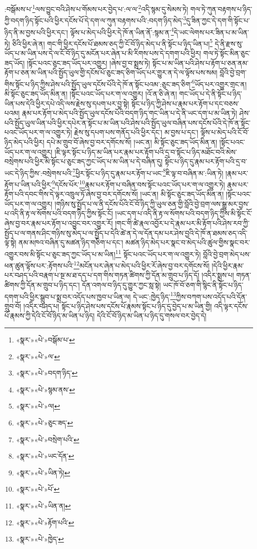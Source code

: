 :བསྒོམས་པ་\footnote{«སྣར་»«པེ་»བསྒོམ་པ་}ལས་བྱུང་བའི་ཤེས་པ་གོམས་པར་བྱེད་པ་:ལ་ལ་\footnote{«སྣར་»«པེ་»ལ་}འདི་སྙམ་དུ་སེམས་ཏེ། གལ་ཏེ་ཀུན་བརྟགས་པ་ཉིད་ཀྱི་བདག་ཉིད་སྟོང་པའི་ཕྱིར་དངོས་པོ་དེ་དག་ལ་ཀུན་བརྟགས་པའི་:བདག་ཉིད་མེད་\footnote{«སྣར་»«པེ་»བདག་ཉིད་}དུ་ཟིན་ཀྱང་དེ་དག་གི་སྟོང་པ་ཉིད་ནི་མ་བྱས་པའི་ཕྱིར་དང་། ལྟོས་པ་མེད་པའི་ཕྱིར་དེ་ཁོ་ན་ཡིན་ནོ་:སྙམ་ན་\footnote{«སྣར་»«པེ་»སྙམ་ནས་}དེ་ཡང་ལེགས་པར་ཟིན་པ་མ་ཡིན་ཏེ། ཅིའི་ཕྱིར་ཞེ་ན། གང་གི་ཕྱིར་དངོས་པོ་ཐམས་ཅད་ཀྱི་ངོ་བོ་ཉིད་མེད་པ་ནི་སྟོང་པ་ཉིད་ཡིན་པ།\footnote{«སྣར་»«པེ་»ལ།} དེ་ནི་རྫས་སུ་ཡོད་པ་མ་ཡིན་པས་དེ་ལ་ངོ་བོ་ཉིད་དུ་མངོན་པར་ཞེན་པ་མི་རིགས་པས་དེ་དགག་པའི་ཕྱིར། གལ་ཏེ་སྟོང་མིན་ཅུང་ཟད་ཡོད། །སྟོང་པའང་ཅུང་ཟད་ཡོད་པར་འགྱུར། །ཞེས་བྱ་བ་སྨྲས་ཏེ། སྟོང་པ་མ་ཡིན་པའི་ཤེས་པ་རྟོག་པ་ཅན་ནམ་རྟོག་པ་ཅན་མ་ཡིན་པའི་སྤྱོད་ཡུལ་གྱི་དངོས་པོ་ཅུང་ཟད་ཅིག་ཡོད་པར་གྱུར་ན་དེ་ལ་ལྟོས་པས་སམ། བློའི་བྱེ་བྲག་གིས་སྟོང་པ་ཉིད་ཀྱིས་ཤེས་པའི་སྤྱོད་ཡུལ་དངོས་པོའི་དེ་ཁོ་ན་སྟོང་པའམ་:ཅུང་ཟད་ཅིག་\footnote{«སྣར་»«པེ་»ཅུང་ཟད་}ཡོད་པར་འགྱུར་གྲང་ན། མི་སྟོང་ཅུང་ཟད་ཡོད་མིན་ན། །སྟོང་པའང་ཡོད་པར་ག་ལ་འགྱུར། །འོ་ན་ཅི་ཞེ་ན། གང་ཡོད་པ་དེ་ནི་སྟོང་པ་ཉིད་ཡིན་པས་དེའི་ཕྱིར་དཔེ་འདི་ལས་རྗེས་སུ་དཔག་པར་བྱ་སྟེ། སྟོང་པ་ཉིད་ཀྱི་ཤེས་པ་རྣམ་པར་རྟོག་པ་དང་བཅས་པའམ། རྣམ་པར་རྟོག་པ་མེད་པའི་སྤྱོད་ཡུལ་དངོས་པོའི་བདག་ཉིད་གང་ཡིན་པ་དེ་ནི་ཡང་དག་པ་མ་ཡིན་ཏེ། ཤེས་པའི་སྤྱོད་ཡུལ་ཡིན་པའི་ཕྱིར་དཔེར་ན་སྟོང་པ་མ་ཡིན་པའི་ཤེས་པའི་སྤྱོད་ཡུལ་བཞིན་པས་དངོས་པོའི་དེ་ཁོ་ན་སྟོང་པའང་ཡོད་པར་ག་ལ་འགྱུར་ཏེ། རྗེས་སུ་དཔག་པས་གནོད་པའི་ཕྱིར་དང་། མ་བྱས་པ་དང་། ལྟོས་པ་མེད་པའི་ངོ་བོ་ཉིད་མེད་པའི་ཕྱིར། དཔེ་མ་གྲུབ་བོ་ཞེས་བྱ་བར་དགོངས་སོ། །ཡང་ན། མི་སྟོང་ཅུང་ཟད་ཡོད་མིན་ན། །སྟོང་པའང་ཡོད་པར་ག་ལ་འགྱུར། །ཇི་ལྟར་སྟོང་པ་ཉིད་མ་ཡིན་པར་རྣམ་པར་རྟོག་པའི་དྲ་བ་སྟོང་པ་ཉིད་མཐོང་བའི་མེས་བསྲེགས་པའི་ཕྱིར་མི་སྟོང་པ་ཅུང་ཟད་ཀྱང་ཡོད་པ་མ་ཡིན་པ་དེ་བཞིན་དུ། སྟོང་པ་ཉིད་དུ་རྣམ་པར་རྟོག་པའི་དྲ་བ་ཡང་དེ་ཉིད་ཀྱིས་:བསྲེགས་པའི་\footnote{«སྣར་»«པེ་»བསྲེག་པའི་}ཕྱིར་སྟོང་པ་ཉིད་དུ་རྣམ་པར་རྟོག་པ་ཡང་\footnote{«སྣར་»«པེ་»ཡང་དོན་}ཇི་ལྟ་བ་བཞིན་མ་:ཡིན་ཏེ། །རྣམ་པར་རྟོག་པ་ཡིན་པའི་ཕྱིར་\footnote{«སྣར་»«པེ་»ཡིན་ཏེ། }དངོས་པོར་\footnote{«སྣར་»«པེ་»པོ་}རྣམ་པར་རྟོག་པ་བཞིན་བས་སྟོང་པའང་ཡོད་པར་ག་ལ་འགྱུར་ཏེ། རྣམ་པར་རྟོག་པའི་དབང་གིས་དེ་ལྟར་འཁྲུལ་ཏོ་ཞེས་བྱ་བར་དགོངས་སོ། །ཡང་ན། མི་སྟོང་ཅུང་ཟད་ཡོད་མིན་ན། །སྟོང་པའང་ཡོད་པར་ག་ལ་འགྱུར། །གཉིས་སུ་སྤྱོད་པ་ལ་ནི་དངོས་པོའི་ངོ་བོ་ཉིད་ཀྱི་ཡུལ་ཅན་གྱི་བློའི་བྱེ་བྲག་ལས་སྒྱུ་མར་བྱས་པ་འདི་ནི་རྟ་ལ་སོགས་པའི་བདག་ཉིད་ཀྱིས་སྟོང་ངོ། །ཡང་དག་པ་འདི་ནི་རྟ་ལ་སོགས་པའི་བདག་ཉིད་ཀྱིས་མི་སྟོང་ངོ་ཞེས་བྱ་བར་རྣམ་པར་རྟོག་པ་འབྱུང་བར་འགྱུར་རོ། །གང་གི་ཚེ་རྣལ་འབྱོར་པ་དེ་རྣམ་པར་མི་རྟོག་པའི་ཤེས་རབ་ཀྱི་སྤྱོད་པ་ལ་གནས་ཤིང་གཉིས་སུ་མེད་པ་ལ་སྤྱོད་པ་དེའི་ཚེ་ན་དེ་ལ་དོན་དམ་པར་ཤེས་བྱའི་དེ་ཁོ་ན་ཐམས་ཅད་འདི་ལྟ་སྟེ། ནམ་མཁའ་བཞིན་དུ་མཚན་ཉིད་གཅིག་པ་དང་། མཚན་ཉིད་མེད་པར་སྣང་བ་མེད་པའི་ཚུལ་གྱིས་སྣང་བར་འགྱུར་བས་མི་སྟོང་པ་ཅུང་ཟད་ཀྱང་ཡོད་པ་མ་ཡིན།\footnote{«སྣར་»«པེ་»ཡིན་ན།} སྟོང་པའང་ཡོད་པར་ག་ལ་འགྱུར་ཏེ། བློའི་བྱེ་བྲག་མེད་པས་ཕན་ཚུན་ལྟོས་པར་:རྟོགས་པའི་\footnote{«སྣར་»«པེ་»རྟོག་པའི་}མངོན་པར་ཞེན་པ་མེད་པའི་ཕྱིར་རོ་ཞེས་བྱ་བར་དགོངས་སོ། །དེའི་ཕྱིར་རྣམ་པར་བཤད་པའི་བརྣག་པ་སྔ་མ་ཐ་དད་པ་དག་གིས་གཏན་ཚིགས་ཀྱི་དོན་མ་གྲུབ་པ་ཉིད་དོ། །འདིར་སྨྲས་པ། གཏན་ཚིགས་ཀྱི་དོན་མ་གྲུབ་པ་ཉིད་དང་། དོན་འགལ་བ་ཉིད་དུ་གྱུར་ཀྱང་སླ་སྟེ། ཡང་ཁོ་བོ་ཅག་གི་སྙིང་ནི་སྟོང་པ་ཉིད་དགག་པའི་ཕྱིར་སྒྲུབ་པ་སྨྲ་བར་འདོད་པས་ཁྱབ་པ་ཡིན་ལ། དེ་ཡང་:ཁྱེད་ཉིད་\footnote{«སྣར་»«པེ་»ཁྱེད་}ཀྱིས་བཀག་པས་འདོད་པའི་དོན་གྲུབ་བོ། །འདིར་བཤད་པ། སྟོང་པ་ཉིད་ཤེས་པས་དངོས་པོ་རྣམས་སྟོང་པ་ཉིད་དུ་བྱེད་པ་མ་ཡིན་གྱི། འདི་ལྟར་དངོས་པོ་རྣམས་ཀྱི་དེའི་ངོ་བོ་ཉིད་མ་ཡིན་པ་ཉིད། དེའི་ངོ་བོ་ཉིད་མ་ཡིན་པ་ཉིད་དུ་གསལ་བར་བྱེད་དེ། 
